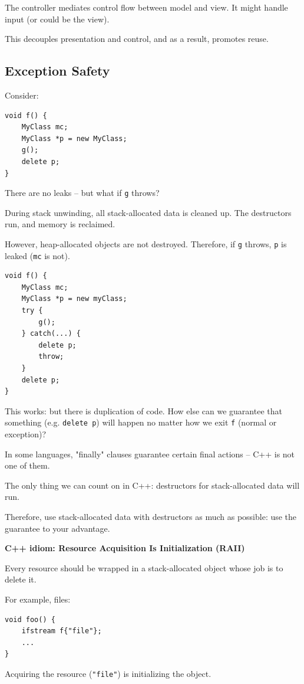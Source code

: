 \documentclass[11pt]{article}
\theoremstyle{definition}
\begin{document}
The controller mediates control flow between model and view. It might handle input (or could be the view).

This decouples presentation and control, and as a result, promotes reuse.

\subsection{Exception Safety}
Consider:
\begin{lstlisting}
void f() {
    MyClass mc;
    MyClass *p = new MyClass;
    g();
    delete p;
}
\end{lstlisting}
\vspace{-0.25cm}
There are no leaks -- but what if {\tt g} throws?

During stack unwinding, all stack-allocated data is cleaned up. The destructors run, and memory is reclaimed.

However, heap-allocated objects are not destroyed. Therefore, if {\tt g} throws, {\tt *p} is leaked ({\tt mc} is not).
\begin{lstlisting}
void f() {
    MyClass mc;
    MyClass *p = new myClass;
    try {
        g();
    } catch(...) {
        delete p;
        throw;
    }
    delete p;
}
\end{lstlisting}
\vspace{-0.25cm}
This works: but there is duplication of code. How else can we guarantee that something (e.g. {\tt delete p}) will happen no matter how we exit {\tt f} (normal or exception)?

In some languages, "finally" clauses guarantee certain final actions -- C++ is not one of them.

The only thing we can count on in C++: destructors for stack-allocated data will run.

Therefore, use stack-allocated data with destructors as much as possible: use the guarantee to your advantage.

{\bf C++ idiom: Resource Acquisition Is Initialization (RAII)}

Every resource should be wrapped in a stack-allocated object whose job is to delete it. 

For example, files:
\begin{lstlisting}
void foo() {
    ifstream f{"file"};
    ...
}
\end{lstlisting}
\vspace{-0.25cm}
Acquiring the resource ({\tt "file"}) is initializing the object.
\end{document}

